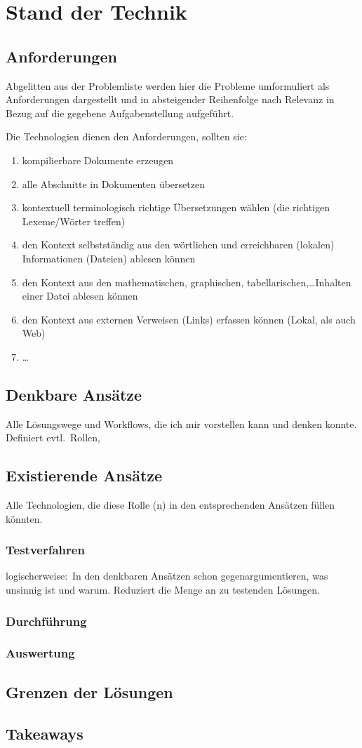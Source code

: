 \section{Stand der Technik}
\subsection{Anforderungen}\label{technologies:demands}
Abgelitten aus der Problemliste werden hier die Probleme umformuliert als Anforderungen dargestellt und in absteigender Reihenfolge nach Relevanz in Bezug auf die gegebene Aufgabenstellung aufgeführt.

Die Technologien dienen den Anforderungen, sollten sie:\ 
\begin{enumerate}
    \item kompilierbare Dokumente erzeugen
    \item alle Abschnitte in Dokumenten übersetzen
    \item kontextuell terminologisch richtige Übersetzungen wählen (die richtigen Lexeme/Wörter treffen)%
    \item den Kontext selbstständig aus den wörtlichen und erreichbaren (lokalen) Informationen (Dateien) ablesen können
    \item den Kontext aus den mathematischen, graphischen, tabellarischen,\ldots Inhalten einer Datei ablesen können
    \item den Kontext aus externen Verweisen (Links) erfassen können (Lokal, als auch Web)
    \item \ldots
\end{enumerate}
\subsection{Denkbare Ansätze}%
Alle Lösungswege und Workflows, die ich mir vorstellen kann und denken konnte. Definiert evtl.\ Rollen,
\subsection{Existierende Ansätze}%
Alle Technologien, die diese Rolle (n) in den entsprechenden Ansätzen füllen könnten.
\subsubsection{Testverfahren}%
logischerweise:\ In den denkbaren Ansätzen schon gegenargumentieren, was unsinnig ist und warum. Reduziert die Menge an zu testenden Lösungen.
\subsubsection{Durchführung}
\subsubsection{Auswertung}
\subsection{Grenzen der Lösungen}%
\subsection{Takeaways}%